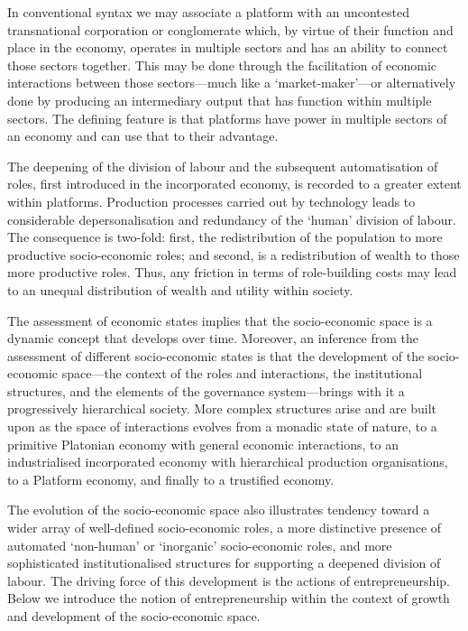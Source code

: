 In conventional syntax we may associate a platform with an uncontested transnational corporation or conglomerate which, by virtue of their function and place in the economy, operates in multiple sectors and has an ability to connect those sectors together. This may be done through the facilitation of economic interactions between those sectors---much like a `market-maker'---or alternatively done by producing an intermediary output that has function within multiple sectors. The defining feature is that platforms have power in multiple sectors of an economy and can use that to their advantage.

The deepening of the division of labour and the subsequent automatisation of roles, first introduced in the incorporated economy, is recorded to a greater extent within platforms. Production processes carried out by technology leads to considerable depersonalisation and redundancy of the `human' division of labour. The consequence is two-fold: first, the redistribution of the population to more productive socio-economic roles; and second, is a redistribution of wealth to those more productive roles. Thus, any friction in terms of role-building costs may lead to an unequal distribution of wealth and utility within society.

\medskip\noindent The assessment of economic states implies that the socio-economic space is a dynamic concept that develops over time. Moreover, an inference from the assessment of different socio-economic states is that the development of the socio-economic space---the context of the roles and interactions, the institutional structures, and the elements of the governance system---brings with it a progressively hierarchical society. More complex structures arise and are built upon as the space of interactions evolves from a monadic state of nature, to a primitive Platonian economy with general economic interactions, to an industrialised incorporated economy with hierarchical production organisations, to a Platform economy, and finally to a trustified economy. 

The evolution of the socio-economic space also illustrates tendency toward a wider array of well-defined socio-economic roles, a more distinctive presence of automated `non-human' or `inorganic' socio-economic roles, and more sophisticated institutionalised structures for supporting a deepened division of labour. The driving force of this development is the actions of entrepreneurship. Below we introduce the notion of entrepreneurship within the context of growth and development of the socio-economic space.

